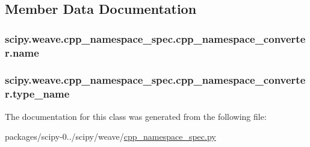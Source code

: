 \subsection{Member Data Documentation}
\hypertarget{classscipy_1_1weave_1_1cpp__namespace__spec_1_1cpp__namespace__converter_a5da0109a8e2b67e4778ee520722c60b3}{}
\subsubsection[{name}]{\setlength{\rightskip}{0pt plus 5cm}scipy.\+weave.\+cpp\+\_\+namespace\+\_\+spec.\+cpp\+\_\+namespace\+\_\+converter.\+name}\label{classscipy_1_1weave_1_1cpp__namespace__spec_1_1cpp__namespace__converter_a5da0109a8e2b67e4778ee520722c60b3}
\hypertarget{classscipy_1_1weave_1_1cpp__namespace__spec_1_1cpp__namespace__converter_a534a159c803e706f820bb99639d3551a}{}
\subsubsection[{type\+\_\+name}]{\setlength{\rightskip}{0pt plus 5cm}scipy.\+weave.\+cpp\+\_\+namespace\+\_\+spec.\+cpp\+\_\+namespace\+\_\+converter.\+type\+\_\+name}\label{classscipy_1_1weave_1_1cpp__namespace__spec_1_1cpp__namespace__converter_a534a159c803e706f820bb99639d3551a}


The documentation for this class was generated from the following file\+:\begin{DoxyCompactItemize}
\item 
packages/scipy-\/0../scipy/weave/\hyperlink{cpp__namespace__spec_8py}{cpp\+\_\+namespace\+\_\+spec.\+py}\end{DoxyCompactItemize}
